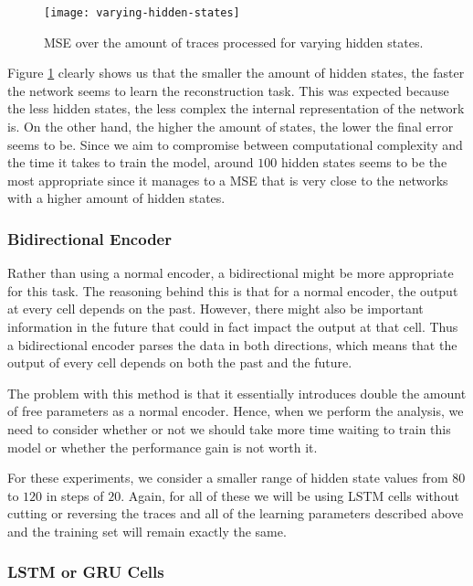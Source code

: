 \begin{figure}[ht]
  \centering
  \texttt{[image: varying-hidden-states]}
  \caption{MSE over the amount of traces processed for varying hidden states.}
  \label{fig:varying-hidden-states}
\end{figure}

Figure \ref{fig:varying-hidden-states} clearly shows us that the smaller the amount of hidden states, the faster the network seems to learn the reconstruction task.
This was expected because the less hidden states, the less complex the internal representation of the network is.
On the other hand, the higher the amount of states, the lower the final error seems to be.
Since we aim to compromise between computational complexity and the time it takes to train the model, around $100$ hidden states seems to be the most appropriate since it manages to a MSE that is very close to the networks with a higher amount of hidden states.

\subsubsection{Bidirectional Encoder}

Rather than using a normal encoder, a bidirectional might be more appropriate for this task.
The reasoning behind this is that for a normal encoder, the output at every cell depends on the past.
However, there might also be important information in the future that could in fact impact the output at that cell.
Thus a bidirectional encoder parses the data in both directions, which means that the output of every cell depends on both the past and the future.

The problem with this method is that it essentially introduces double the amount of free parameters as a normal encoder.
Hence, when we perform the analysis, we need to consider whether or not we should take more time waiting to train this model or whether the performance gain is not worth it.

For these experiments, we consider a smaller range of hidden state values from $80$ to $120$ in steps of $20$.
Again, for all of these we will be using LSTM cells without cutting or reversing the traces and all of the learning parameters described above and the training set will remain exactly the same.


\subsubsection{LSTM or GRU Cells}

